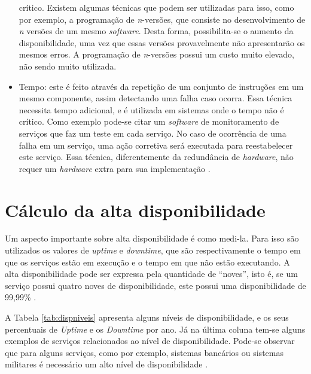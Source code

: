 \begin{itemize}
 crítico. Existem algumas técnicas que podem ser utilizadas para isso, como por exemplo, a programação de \textit{n}-versões, que consiste 
 no desenvolvimento de \textit{n} versões de um mesmo \textit{software}. Desta forma, possibilita-se o aumento da disponibilidade, uma vez que 
 essas versões provavelmente não apresentarão os mesmos erros. A programação de \textit{n}-versões possui um custo muito elevado, não sendo muito 
 utilizada.
 \item Tempo: este é feito através da repetição de um conjunto de instruções em um mesmo componente, assim detectando uma falha caso ocorra. 
 Essa técnica necessita tempo adicional, e é utilizada em sistemas onde o tempo não é crítico. Como exemplo pode-se citar um \textit{software} 
 de monitoramento de serviços que faz um teste em cada serviço. No caso de ocorrência de uma falha em um serviço, uma ação corretiva 
 será executada para reestabelecer este serviço. Essa técnica, diferentemente da redundância de \textit{hardware}, não requer um 
 \textit{hardware} extra para sua implementação \cite{costa2009}.
\end{itemize}

\section{Cálculo da alta disponibilidade}

Um aspecto importante sobre alta disponibilidade é como medi-la. Para isso são utilizados os valores de \textit{uptime} e \textit{downtime}, 
que são respectivamente o tempo em que os serviços estão em execução e o tempo em que não estão executando. A alta disponibilidade 
pode ser expressa pela quantidade de ``noves'', isto é, se um serviço possui quatro noves de disponibilidade, este possui uma 
disponibilidade de 99,99\% \cite{pereirafilho2004}.

A Tabela \ref{tab:dispniveis} apresenta alguns níveis de disponibilidade, e os seus percentuais de \textit{Uptime} e os \textit{Downtime} por ano. 
Já na última coluna tem-se alguns exemplos de serviços relacionados ao nível de disponibilidade. Pode-se observar que para alguns serviços, 
como por exemplo, sistemas bancários ou sistemas militares é necessário um alto nível de disponibilidade \cite{pereirafilho2004}.

